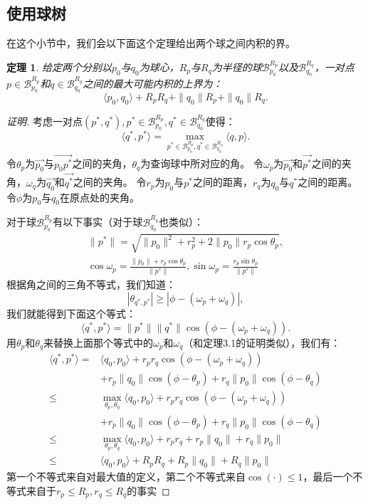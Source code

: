 \documentclass[twocolumn]{article}
\begin{document}
\subsection{使用球树}
在这个小节中，我们会以下面这个定理给出两个球之间内积的界。
\newtheorem{theorem2}{定理}[section]
\begin{theorem2}
给定两个分别以$p_0$与$q_0$为球心，$R_p$与$R_q$为半径的球$\mathcal{B}_{p_0}^{R_p}$以及$\mathcal{B}_{q_0}^{R_q}$，一对点$p\in\mathcal{B}_{p_0}^{R_p}$和$q\in\mathcal{B}_{q_0}^{R_q}$之间的最大可能内积的上界为：
\begin{equation}
\langle p_0,q_0 \rangle + R_p R_q + \|q_0\|R_p + \|q_0\|R_q.
\end{equation}
\end{theorem2}
\begin{proof}[证明]
考虑一对点$(p^*,q^*),p^*\in\mathcal{B}_{p_0}^{R_p},q^*\in\mathcal{B}_{q_0}^{R_q}$使得：
\begin{equation}
\langle q^*,p^* \rangle = \max_{p^*\in\mathcal{B}_{p_0}^{R_p},q^*\in\mathcal{B}_{q_0}^{R_q}} \langle q,p \rangle.
\end{equation}
令$\theta_p$为$\vec{p_0}$与$\vec{p_0 p^*}$之间的夹角，$\theta_q$为查询球中所对应的角。
令$\omega_p$为$\vec{p_0}$和$\vec{p^*}$之间的夹角，$\omega_q$为$\vec{q_0}$和$\vec{q^*}$之间的夹角。
令$r_p$为$p_0$与$p^*$之间的距离，$r_q$为$q_0$与$q^*$之间的距离。
令$\phi$为$p_0$与$q_0$在原点处的夹角。

对于球$\mathcal{B}_{p_0}^{R_p}$有以下事实（对于球$\mathcal{B}_{q_0}^{R_q}$也类似）：
\begin{gather*}
\|p^*\| = \sqrt{\|p_0\|^2+r_p^2+2\|p_0\|r_p\cos\theta_p}, \\
\cos\omega_p = \frac{\|p_0\|+r_p\cos\theta_p}{\|p^*\|},\sin\omega_p = \frac{r_p\sin\theta_p}{\|p^*\|}
\end{gather*}
根据角之间的三角不等式，我们知道：
\begin{equation*}
|\theta_{q^*,p^*}| \ge |\phi - (\omega_p + \omega_q)|,
\end{equation*}
我们就能得到下面这个等式：
\begin{equation}
\langle q^*,p^* \rangle = \|p^*\|\|q^*\|\cos(\phi-(\omega_p+\omega_q)).
\end{equation}
用$\theta_p$和$\theta_q$来替换上面那个等式中的$\omega_p$和$\omega_q$（和定理3.1的证明类似），我们有：
\begin{align*}
\langle q^*,p^* \rangle =
    & \langle q_0,p_0 \rangle + r_p r_q\cos(\phi-(\omega_p+\omega_q)) \\
    & + r_p\|q_0\|\cos(\phi-\theta_p)+r_q\|p_0\|\cos(\phi-\theta_q) \\
\le & \max_{\theta_p,\theta_q}\langle q_0,p_0 \rangle + r_p r_q\cos(\phi-(\omega_p+\omega_q)) \\
    & + r_p\|q_0\|\cos(\phi-\theta_p)+r_q\|p_0\|\cos(\phi-\theta_q) \\
\le & \max_{\theta_p,\theta_q}\langle q_0,p_0 \rangle + r_p r_q + r_p\|q_0\| + r_q\|p_0\| \\
\le & \langle q_0,p_0 \rangle + R_p R_q + R_p\|q_0\| + R_q\|p_0\|
\end{align*}
第一个不等式来自对最大值的定义，第二个不等式来自$\cos(\cdot)\le1$，最后一个不等式来自于$r_p \le R_p, r_q \le R_q$的事实
\end{proof}
\end{document}
